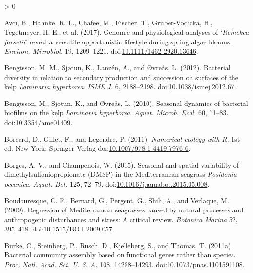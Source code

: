 \documentclass[
  12pt,
]{article}
\newlength{\cslhangindent}
\newenvironment{CSLReferences}[2] %
 {%
  \setlength{\parindent}{0pt}
  \ifodd #1 \everypar{\setlength{\hangindent}{\cslhangindent}}\ignorespaces\fi
  \ifnum #2 > 0
  \setlength{\parskip}{#2\baselineskip}
  \fi
 }%
 {}
\begin{document}
\begin{CSLReferences}{1}{0}
\leavevmode\hypertarget{ref-Avci2017}{}%
Avcı, B., Hahnke, R. L., Chafee, M., Fischer, T., Gruber-Vodicka, H.,
Tegetmeyer, H. E., et al. (2017). Genomic and physiological analyses of
`{{\emph{Reinekea forsetii}}' reveal a versatile opportunistic lifestyle
during spring algae blooms}. \emph{Environ. Microbiol.} 19, 1209--1221.
doi:\href{https://doi.org/10.1111/1462-2920.13646}{10.1111/1462-2920.13646}.

\leavevmode\hypertarget{ref-Bengtsson2012}{}%
Bengtsson, M. M., Sjøtun, K., Lanzén, A., and Øvreås, L. (2012).
Bacterial diversity in relation to secondary production and succession
on surfaces of the kelp {\emph{Laminaria hyperborea}}. \emph{ISME J.} 6,
2188--2198.
doi:\href{https://doi.org/10.1038/ismej.2012.67}{10.1038/ismej.2012.67}.

\leavevmode\hypertarget{ref-Bengtsson2010}{}%
Bengtsson, M., Sjøtun, K., and Øvreås, L. (2010). Seasonal dynamics of
bacterial biofilms on the kelp {\emph{Laminaria hyperborea}}.
\emph{Aquat. Microb. Ecol.} 60, 71--83.
doi:\href{https://doi.org/10.3354/ame01409}{10.3354/ame01409}.

\leavevmode\hypertarget{ref-Borcard2011}{}%
Borcard, D., Gillet, F., and Legendre, P. (2011). \emph{Numerical
ecology with {R}}. 1st ed. {New York}: {Springer-Verlag}
doi:\href{https://doi.org/10.1007/978-1-4419-7976-6}{10.1007/978-1-4419-7976-6}.

\leavevmode\hypertarget{ref-Borges2015}{}%
Borges, A. V., and Champenois, W. (2015). Seasonal and spatial
variability of dimethylsulfoniopropionate ({DMSP}) in the
{Mediterranean} seagrass {\emph{Posidonia oceanica}}. \emph{Aquat. Bot.}
125, 72--79.
doi:\href{https://doi.org/10.1016/j.aquabot.2015.05.008}{10.1016/j.aquabot.2015.05.008}.

\leavevmode\hypertarget{ref-Boudouresque2009}{}%
Boudouresque, C. F., Bernard, G., Pergent, G., Shili, A., and Verlaque,
M. (2009). Regression of {Mediterranean} seagrasses caused by natural
processes and anthropogenic disturbances and stress: A critical review.
\emph{Botanica Marina} 52, 395--418.
doi:\href{https://doi.org/10.1515/BOT.2009.057}{10.1515/BOT.2009.057}.

\leavevmode\hypertarget{ref-Burke2011}{}%
Burke, C., Steinberg, P., Rusch, D., Kjelleberg, S., and Thomas, T.
(2011a). Bacterial community assembly based on functional genes rather
than species. \emph{Proc. Natl. Acad. Sci. U. S. A.} 108, 14288--14293.
doi:\href{https://doi.org/10.1073/pnas.1101591108}{10.1073/pnas.1101591108}.


\end{CSLReferences}
\end{document}
